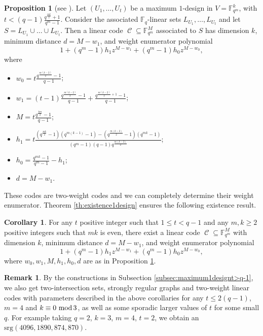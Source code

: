 \documentclass[11pt]{amsart}
\DeclareMathOperator{\C}{\mathcal{C}}
\theoremstyle{definition}
\newtheorem{corollary}[theorem]{Corollary}
\newtheorem{proposition}[theorem]{Proposition}
\newtheorem{remark}[theorem]{Remark}
\newcommand{\F}{{\mathbb F}}
\newcommand{\fq}{{\mathbb F}_{q}}
\renewcommand{\mod}{\hbox{{\rm mod}\,}}
\begin{document}
\begin{proposition} [see \textnormal{\cite[Corollary 5.24]{santonastaso2022subspace}}] \label{prop:parametertwoweightcodes}
Let $(U_1,\ldots,U_t)$ be a maximum $1$-design in $V=\F_{q^m}^k$, with $t< (q-1)\frac{q^{\frac{mk}2}+1}{q^m-1}$.
Consider the associated $\fq$-linear sets $L_{U_1},\ldots,L_{U_t}$ and let $S=L_{U_1}\cup \ldots\cup L_{U_t}$.
Then a linear code $\C \subseteq \F_{q^m}^M$ associated to $S$ has dimension $k$, minimum distance $d=M-w_1$, and weight enumerator polynomial
\[ 1+(q^m-1)h_1z^{M-w_1}+(q^m-1)h_0z^{M-w_0}, \]
where
\begin{itemize}
    \item $w_0=t \frac{q^{\frac{m(k-2)}{2}}-1}{q-1}$;
    \item $w_1=(t-1) \frac{q^{\frac{m(k-2)}{2}}-1}{q-1}+\frac{q^{\frac{m(k-2)}{2}+1}-1}{q-1}$;
    \item $M=t\frac{q^{\frac{km}2}-1}{q-1}$;
    \item $h_1=t\frac{(q^{\frac{mk}2}-1)(q^{m(k-1)}-1)-(q^{\frac{m(k-2)}2}-1)(q^{mk}-1)}{(q^m-1)(q-1)q^{\frac{m(k-2)}2}}$;
    \item $h_0=\frac{q^{mk}-1}{q^m-1}-h_1$;
    \item $d=M-w_1$.
\end{itemize}
\end{proposition}


These codes are two-weight codes and we can completely determine their weight enumerator. Theorem \ref{th:existence1design} ensures the following existence result.

\begin{corollary}
 For any $t$ positive integer such that $1\leq t <q-1$ and any $m,k \geq 2$ positive integers such that $mk$ is even, there exist a linear code $\C \subseteq \F_{q^m}^M$ with dimension $k$, minimum distance $d=M-w_1$, and weight enumerator polynomial
\[ 1+(q^m-1)h_1z^{M-w_1}+(q^m-1)h_0z^{M-w_0}, \]
where $w_0,w_1,M,h_1,h_0,d$ are as in Proposition \ref{prop:parametertwoweightcodes}.
\end{corollary}


\begin{remark}
By the constructions in Subsection \ref{subsec:maximum1designt>q-1}, we also get two-intersection sets, strongly regular graphs and two-weight linear codes with parameters described in the above corollaries for any $t \leq 2(q-1)$, $m=4$ and $k \equiv 0 \ \mod 3$, as well as some sporadic larger values of $t$ for some small $q$. For example taking $q=2$, $k=3$, $m=4$, $t=2$, we obtain an $\mathrm{srg}(4096,1890,874,870)$.
\end{remark}
\end{document}
